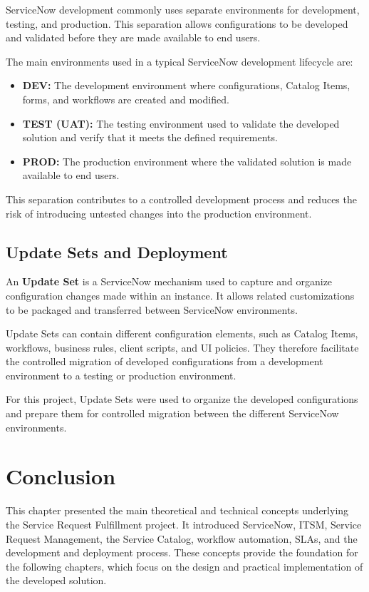 \documentclass[12pt,a4paper]{report}
\begin{document}
ServiceNow development commonly uses separate environments for development,
testing, and production. This separation allows configurations to be
developed and validated before they are made available to end users.

The main environments used in a typical ServiceNow development lifecycle are:

\begin{itemize}
    \item \textbf{DEV:} The development environment where configurations,
    Catalog Items, forms, and workflows are created and modified.

    \item \textbf{TEST (UAT):} The testing environment used to validate the
    developed solution and verify that it meets the defined requirements.

    \item \textbf{PROD:} The production environment where the validated
    solution is made available to end users.
\end{itemize}

This separation contributes to a controlled development process and reduces
the risk of introducing untested changes into the production environment.

\subsection{Update Sets and Deployment}

An \textbf{Update Set} is a ServiceNow mechanism used to capture and organize
configuration changes made within an instance. It allows related
customizations to be packaged and transferred between ServiceNow
environments.

Update Sets can contain different configuration elements, such as Catalog
Items, workflows, business rules, client scripts, and UI policies. They
therefore facilitate the controlled migration of developed configurations
from a development environment to a testing or production environment.

For this project, Update Sets were used to organize the developed
configurations and prepare them for controlled migration between the
different ServiceNow environments.


\section{Conclusion}

This chapter presented the main theoretical and technical concepts underlying
the Service Request Fulfillment project. It introduced ServiceNow, ITSM,
Service Request Management, the Service Catalog, workflow automation, SLAs,
and the development and deployment process. These concepts provide the
foundation for the following chapters, which focus on the design and practical
implementation of the developed solution.
\end{document}
